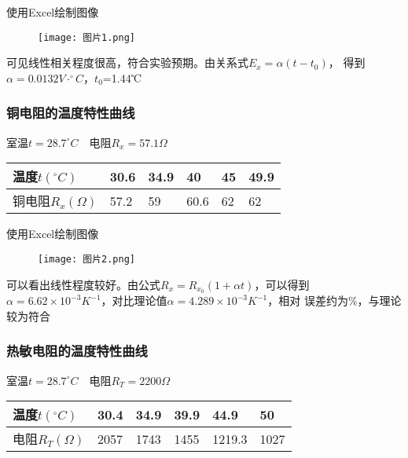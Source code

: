 \documentclass[11pt,a4paper]{article}
\begin{document}
    使用Excel绘制图像
    \begin{figure}[H]
        \centering
        \texttt{[image: 图片1.png]}
    \end{figure}

    可见线性相关程度很高，符合实验预期。由关系式${E_x} = \alpha \left( {t - {t_0}} \right)$，
    得到$\alpha=0.0132V \cdot ^{\circ}C$，$t_0$=1.44℃

    \subsubsection{铜电阻的温度特性曲线}

    \begin{center}
        室温$t=28.7^{\circ}C\quad$电阻$R_x=57.1\Omega$
    \end{center}

    \begin{table}[H]
        \centering
        \begin{tabular}{|l|l|l|l|l|l|}
        \hline
            温度$t(^{\circ}C)$ & 30.6 & 34.9 & 40 & 45 & 49.9 \\ \hline
            铜电阻$R_x(\Omega)$ & 57.2 & 59 & 60.6 & 62 & 62 \\ \hline
        \end{tabular}
    \end{table}

    使用Excel绘制图像
    \begin{figure}[H]
        \centering
        \texttt{[image: 图片2.png]}
    \end{figure}

    可以看出线性程度较好。由公式${R_x} = {R_{{x_0}}}\left( {1 + \alpha t} \right)$，可以得到
    $\alpha=6.62\times 10^{-3}K^{-1}$，对比理论值$\alpha=4.289\times 10^{-3}K^{-1}$，相对
    误差约为$\%$，与理论较为符合

    \subsubsection{热敏电阻的温度特性曲线}

    \begin{center}
        室温$t=28.7^{\circ}C\quad$电阻$R_T=2200\Omega$
    \end{center}

    \begin{table}[H]
        \centering
        \begin{tabular}{|l|l|l|l|l|l|}
        \hline
            温度$t(^{\circ}C)$ & 30.4 & 34.9 & 39.9 & 44.9 & 50 \\ \hline
            电阻$R_T(\Omega)$ & 2057 & 1743 & 1455 & 1219.3 & 1027 \\ \hline
        \end{tabular}
    \end{table}
\end{document}
